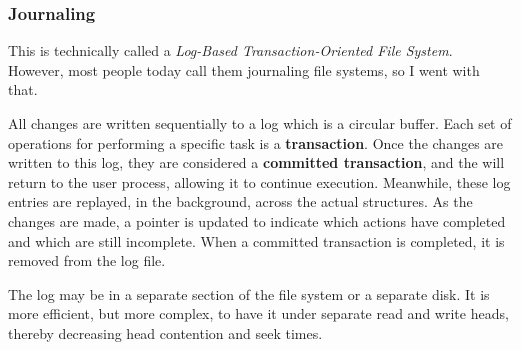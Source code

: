 \subsubsection{Journaling}\label{subsubsec:Journaling}
This is technically called a \emph{Log-Based Transaction-Oriented File System}.
However, most people today call them journaling file systems, so I went with that.

All  changes are written sequentially to a log which is a circular buffer.
Each set of operations for performing a specific task is a \textbf{transaction}.
Once the changes are written to this log, they are considered a \textbf{committed transaction}, and the  will return to the user process, allowing it to continue execution.
Meanwhile, these log entries are replayed, in the background, across the actual  structures.
As the changes are made, a pointer is updated to indicate which actions have completed and which are still incomplete.
When a committed transaction is completed, it is removed from the log file.

The log may be in a separate section of the file system or a separate disk.
It is more efficient, but more complex, to have it under separate read and write heads, thereby decreasing head contention and seek times.


